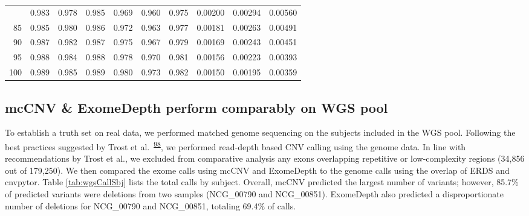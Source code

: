 \documentclass[11pt,letterpaper]{book}
\begin{document}
\begin{table}
\begin{tabular}[t]{rrrrrrrrrr}
\addlinespace
80 & 0.983 & 0.978 & 0.985 & 0.969 & 0.960 & 0.975 & 0.00200 & 0.00294 & 0.00560\\
85 & 0.985 & 0.980 & 0.986 & 0.972 & 0.963 & 0.977 & 0.00181 & 0.00263 & 0.00491\\
90 & 0.987 & 0.982 & 0.987 & 0.975 & 0.967 & 0.979 & 0.00169 & 0.00243 & 0.00451\\
95 & 0.988 & 0.984 & 0.988 & 0.978 & 0.970 & 0.981 & 0.00156 & 0.00223 & 0.00393\\
100 & 0.989 & 0.985 & 0.989 & 0.980 & 0.973 & 0.982 & 0.00150 & 0.00195 & 0.00359\\
\bottomrule
\end{tabular}
\end{table}

\hypertarget{mccnv-exomedepth-perform-comparably-on-wgs-pool}{%
\subsection{mcCNV \& ExomeDepth perform comparably on WGS pool}\label{mccnv-exomedepth-perform-comparably-on-wgs-pool}}

To establish a truth set on real data, we performed matched genome sequencing on the subjects included in the WGS pool.
Following the best practices suggested by Trost et al.~\textsuperscript{\protect\hyperlink{ref-trost:2018aa}{98}}, we performed read-depth based CNV calling using the genome data.
In line with recommendations by Trost et al., we excluded from comparative analysis any exons overlapping repetitive or low-complexity regions (34,856 out of 179,250).
We then compared the exome calls using mcCNV and ExomeDepth to the genome calls using the overlap of ERDS and cnvpytor.
Table \ref{tab:wgsCallSbj} lists the total calls by subject.
Overall, mcCNV predicted the largest number of variants; however, 85.7\% of predicted variants were deletions from two samples (NCG\_00790 and NCG\_00851).
ExomeDepth also predicted a disproportionate number of deletions for NCG\_00790 and NCG\_00851, totaling 69.4\% of calls.
\end{document}

